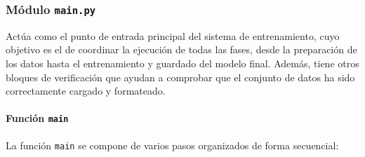 \documentclass[12pt, a4paper, twoside]{article}
\begin{document}
	
	\subsubsection{Módulo \texttt{main.py}}
	
	Actúa como el punto de entrada principal del sistema de entrenamiento, cuyo objetivo es el de coordinar la ejecución de todas las fases, desde la preparación de los datos hasta el entrenamiento y guardado del modelo final. Además, tiene otros bloques de verificación que ayudan a comprobar que el conjunto de datos ha sido correctamente cargado y formateado.
	
	\paragraph{Función \texttt{main}}
	
	La función \texttt{main} se compone de varios pasos organizados de forma secuencial:
	
\end{document}
